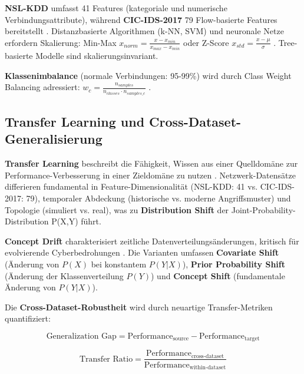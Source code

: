 \documentclass[11pt,a4paper]{article}
\begin{document}
    \textbf{NSL-KDD} umfasst 41 Features (kategoriale und numerische Verbindungsattribute), während \textbf{CIC-IDS-2017} 79 Flow-basierte Features bereitstellt \parencite{Gharib2016,Sharafaldin2018}. Distanzbasierte Algorithmen (k-NN, SVM) und neuronale Netze erfordern Skalierung: Min-Max $x_{norm} = \frac{x - x_{min}}{x_{max} - x_{min}}$ oder Z-Score $x_{std} = \frac{x - \mu}{\sigma}$ \parencite{Bishop2006}. Tree-basierte Modelle sind skalierungsinvariant.

    \textbf{Klassenimbalance} (normale Verbindungen: 95-99\%) wird durch Class Weight Balancing adressiert: $w_c = \frac{n_{samples}}{n_{classes} \cdot n_{samples\_c}}$ \parencite{Ring2019,Hastie2009}.

    \subsection{Transfer Learning und Cross-Dataset-Generalisierung}

    \textbf{Transfer Learning} beschreibt die Fähigkeit, Wissen aus einer Quelldomäne zur Performance-Verbesserung in einer Zieldomäne zu nutzen \parencite{Goodfellow2016}. Netzwerk-Datensätze differieren fundamental in Feature-Dimensionalität (NSL-KDD: 41 vs. CIC-IDS-2017: 79), temporaler Abdeckung (historische vs. moderne Angriffsmuster) und Topologie (simuliert vs. real), was zu \textbf{Distribution Shift} der Joint-Probability-Distribution P(X,Y) führt.

    \textbf{Concept Drift} charakterisiert zeitliche Datenverteilungsänderungen, kritisch für evolvierende Cyberbedrohungen \parencite{Ring2019}. Die Varianten umfassen \textbf{Covariate Shift} (Änderung von $P(X)$ bei konstantem $P(Y|X)$), \textbf{Prior Probability Shift} (Änderung der Klassenverteilung $P(Y)$) und \textbf{Concept Shift} (fundamentale Änderung von $P(Y|X)$).

    Die \textbf{Cross-Dataset-Robustheit} wird durch neuartige Transfer-Metriken quantifiziert:

    \begin{equation}
        \text{Generalization Gap} = \text{Performance}_{\text{source}} - \text{Performance}_{\text{target}}
    \end{equation}

    \begin{equation}
        \text{Transfer Ratio} = \frac{\text{Performance}_{\text{cross-dataset}}}{\text{Performance}_{\text{within-dataset}}}
    \end{equation}
\end{document}
